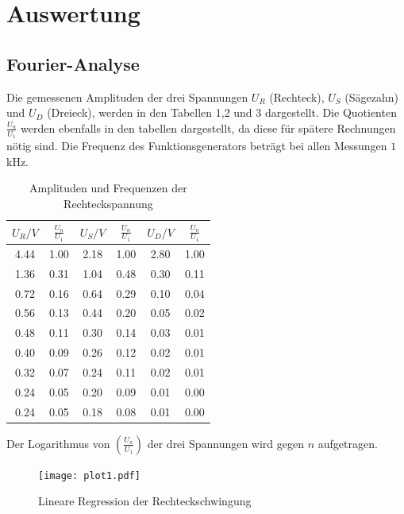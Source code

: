 \section{Auswertung}
\label{sec:Auswertung}

\subsection{Fourier-Analyse}

Die gemessenen Amplituden der drei Spannungen $U_R$ (Rechteck), $U_S$ (Sägezahn) und $U_D$ (Dreieck), werden in den Tabellen 1,2 und 3 dargestellt.
Die Quotienten $\frac{U_n}{U_1}$ werden ebenfalls in den tabellen dargestellt, da diese für
spätere Rechnungen nötig sind.
 Die Frequenz des Funktionsgenerators beträgt bei allen Messungen $1$kHz.

\begin{table}[H]
  \centering
  \caption{Amplituden und Frequenzen der Rechteckspannung}
  \label{tab:Rechteckspannung}
  \begin{tabular}{c c | c c | c c}
    \toprule
    $U_R/V$ & $\frac{U_n}{U_1}$ & $U_S/V$ & $\frac{U_n}{U_1}$ & $U_D/V$ & $\frac{U_n}{U_1}$ \\
    \midrule
    4.44 & 1.00 & 2.18 & 1.00 & 2.80 &  1.00 \\
    1.36 & 0.31 & 1.04 & 0.48 & 0.30 &  0.11\\
    0.72 & 0.16 & 0.64 & 0.29 & 0.10 &  0.04\\
    0.56 & 0.13 & 0.44 & 0.20 & 0.05 &  0.02\\
    0.48 & 0.11 & 0.30 & 0.14 & 0.03 &  0.01\\
    0.40 & 0.09 & 0.26 & 0.12 & 0.02 &  0.01\\
    0.32 & 0.07 & 0.24 & 0.11 & 0.02 &  0.01\\
    0.24 & 0.05 & 0.20 & 0.09 & 0.01 &  0.00\\
    0.24 & 0.05 & 0.18 & 0.08 & 0.01 &  0.00\\
    \bottomrule
  \end{tabular}
\end{table}

Der Logarithmus von $\left( \frac{U_n}{U_1}\right)$ der drei Spannungen wird gegen $n$ aufgetragen.

\begin{figure}
  \centering
  \texttt{[image: plot1.pdf]}
  \caption{Lineare Regression der Rechteckschwingung}
  \label{fig:rechteck}
\end{figure}

